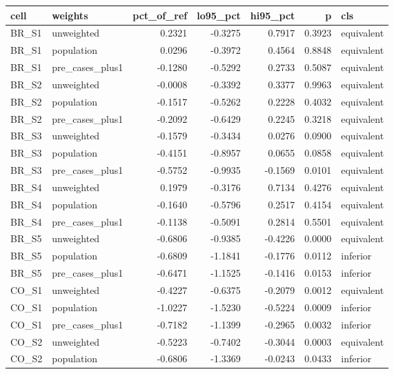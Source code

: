 \begin{tabular}{llrrrrl}
\toprule
cell & weights & pct\_of\_ref & lo95\_pct & hi95\_pct & p & cls \\
\midrule
BR\_S1 & unweighted & 0.2321 & -0.3275 & 0.7917 & 0.3923 & equivalent \\
BR\_S1 & population & 0.0296 & -0.3972 & 0.4564 & 0.8848 & equivalent \\
BR\_S1 & pre\_cases\_plus1 & -0.1280 & -0.5292 & 0.2733 & 0.5087 & equivalent \\
BR\_S2 & unweighted & -0.0008 & -0.3392 & 0.3377 & 0.9963 & equivalent \\
BR\_S2 & population & -0.1517 & -0.5262 & 0.2228 & 0.4032 & equivalent \\
BR\_S2 & pre\_cases\_plus1 & -0.2092 & -0.6429 & 0.2245 & 0.3218 & equivalent \\
BR\_S3 & unweighted & -0.1579 & -0.3434 & 0.0276 & 0.0900 & equivalent \\
BR\_S3 & population & -0.4151 & -0.8957 & 0.0655 & 0.0858 & equivalent \\
BR\_S3 & pre\_cases\_plus1 & -0.5752 & -0.9935 & -0.1569 & 0.0101 & equivalent \\
BR\_S4 & unweighted & 0.1979 & -0.3176 & 0.7134 & 0.4276 & equivalent \\
BR\_S4 & population & -0.1640 & -0.5796 & 0.2517 & 0.4154 & equivalent \\
BR\_S4 & pre\_cases\_plus1 & -0.1138 & -0.5091 & 0.2814 & 0.5501 & equivalent \\
BR\_S5 & unweighted & -0.6806 & -0.9385 & -0.4226 & 0.0000 & equivalent \\
BR\_S5 & population & -0.6809 & -1.1841 & -0.1776 & 0.0112 & inferior \\
BR\_S5 & pre\_cases\_plus1 & -0.6471 & -1.1525 & -0.1416 & 0.0153 & inferior \\
CO\_S1 & unweighted & -0.4227 & -0.6375 & -0.2079 & 0.0012 & equivalent \\
CO\_S1 & population & -1.0227 & -1.5230 & -0.5224 & 0.0009 & inferior \\
CO\_S1 & pre\_cases\_plus1 & -0.7182 & -1.1399 & -0.2965 & 0.0032 & inferior \\
CO\_S2 & unweighted & -0.5223 & -0.7402 & -0.3044 & 0.0003 & equivalent \\
CO\_S2 & population & -0.6806 & -1.3369 & -0.0243 & 0.0433 & inferior \\

\end{tabular}
